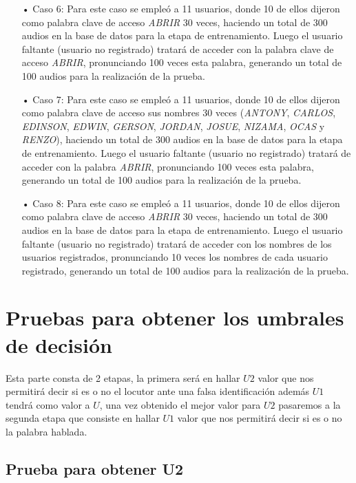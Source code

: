 \begin{enumerate}
\item[•]Caso 6: Para este caso se empleó a 11 usuarios, donde 10 de ellos dijeron como palabra clave de acceso \textit{ABRIR} 30 veces, haciendo un total de 300 audios en la base de datos para la etapa de entrenamiento. Luego el usuario faltante (usuario no registrado) tratará de acceder con la palabra clave de acceso \textit{ABRIR}, pronunciando 100 veces esta palabra, generando un total de 100 audios para la realización de la prueba.
\item[•]Caso 7: Para este caso se empleó a 11 usuarios, donde 10 de ellos dijeron como palabra clave de acceso sus nombres 30 veces (\textit{ANTONY}, \textit{CARLOS}, \textit{EDINSON}, \textit{EDWIN}, \textit{GERSON}, \textit{JORDAN}, \textit{JOSUE}, \textit{NIZAMA}, \textit{OCAS} y\textit{ RENZO}), haciendo un total de 300 audios en la base de datos para la etapa de entrenamiento. Luego el usuario faltante (usuario no registrado) tratará de acceder con la palabra \textit{ABRIR}, pronunciando 100 veces esta palabra, generando un total de 100 audios para la realización de la prueba.
\item[•]Caso 8: Para este caso se empleó a 11 usuarios, donde 10 de ellos dijeron como palabra clave de acceso \textit{ABRIR} 30 veces, haciendo un total de 300 audios en la base de datos para la etapa de entrenamiento. Luego el usuario faltante (usuario no registrado) tratará de acceder con los nombres de los usuarios registrados, pronunciando 10 veces los nombres de cada usuario registrado, generando un total de 100 audios para la realización de la prueba.
\end{enumerate}

\section{Pruebas para obtener los umbrales de decisión}
Esta parte consta de 2 etapas, la primera será en hallar $U2$ valor que nos permitirá decir si es o no el locutor ante una falsa identificación además $U1$ tendrá como valor a $U$, una vez obtenido el mejor valor para $U2$ pasaremos a la segunda etapa que consiste en hallar $U1$ valor que nos permitirá decir si es o no la palabra hablada.

\subsection{Prueba para obtener U2}
